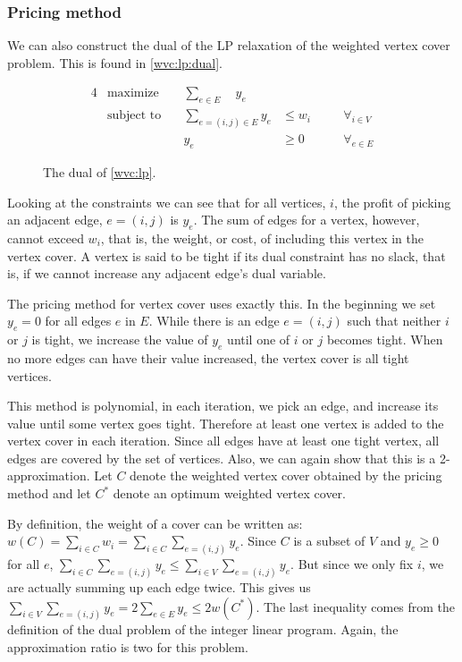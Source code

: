 \documentclass[a4paper]{article}
\newcommand{\newpar}{\bigskip\noindent}
\begin{document}
	\subsubsection{Pricing method}
	We can also construct the dual of the LP relaxation of the weighted vertex cover problem. This is found in \autoref{wvc:lp:dual}.
	
	\begin{figure}[H]
		\begin{alignat*}{4}
		& \text{maximize} & \sum_{e\in E}\quad y_e & \\
		& \text{subject to} \quad & \sum_{e = (i,j) \in E} y_e & \leq w_i \quad && \forall_{i \in V}\\
		& & y_e & \geq 0 && \forall_{e\in E}
		\end{alignat*}
		\caption{The dual of \autoref{wvc:lp}.}
		\label{wvc:lp:dual}
	\end{figure}
	
	\newpar Looking at the constraints we can see that for all vertices, $i$, the profit of picking an adjacent edge, $e = (i,j)$ is $y_e$. The sum of edges for a vertex, however, cannot exceed $w_i$, that is, the weight, or cost, of including this vertex in the vertex cover. A vertex is said to be tight if its dual constraint has no slack, that is, if we cannot increase any adjacent edge's dual variable.
	
	\noindent The pricing method for vertex cover uses exactly this. In the beginning we set $y_e = 0$ for all edges $e$ in $E$. While there is an edge $e = (i,j)$ such that neither $i$ or $j$ is tight, we increase the value of $y_e$ until one of $i$ or $j$ becomes tight. When no more edges can have their value increased, the vertex cover is all tight vertices.
	
	This method is polynomial, in each iteration, we pick an edge, and increase its value until some vertex goes tight. Therefore at least one vertex is added to the vertex cover in each iteration. Since all edges have at least one tight vertex, all edges are covered by the set of vertices. Also, we can again show that this is a 2-approximation. Let $C$ denote the weighted vertex cover obtained by the pricing method and let $C^*$ denote an optimum weighted vertex cover.
	
	\newpar By definition, the weight of a cover can be written as: $w(C) = \sum_{i\in C}w_i = \sum_{i\in C}\sum_{e = (i,j)}y_e$. Since $C$ is a subset of $V$ and $y_e \geq 0$ for all $e$, $\sum_{i\in C}\sum_{e = (i,j)}y_e \leq \sum_{i \in V}\sum_{e = (i,j)}y_e$. But since we only fix $i$, we are actually summing up each edge twice. This gives us $\sum_{i \in V}\sum_{e = (i,j)}y_e = 2\sum_{e\in E}y_e \leq 2w(C^*)$. The last inequality comes from the definition of the dual problem of the integer linear program. Again, the approximation ratio is two for this problem.
	
\end{document}
